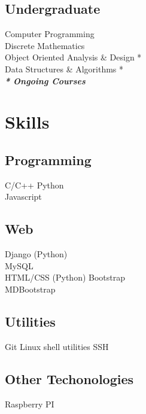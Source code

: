 \documentclass[]{deedy-resume-openfont}
\begin{document}
\begin{minipage}[t]{0.30\textwidth}

\subsection{Undergraduate}
Computer Programming \\
Discrete Mathematics \\
Object Oriented Analysis \& Design * \\
Data Structures \& Algorithms * \\
{\footnotesize \textit{\textbf{* Ongoing Courses}}}
\sectionsep


\section{Skills}
\subsection{Programming}
\textbullet{}   C/C++  \textbullet{} Python \\
\textbullet{} Javascript 
\sectionsep

\subsection{Web}
\textbullet{} Django (Python) \\ \textbullet{} MySQL \\ 
\textbullet{} HTML/CSS (Python) \textbullet{} Bootstrap \\ 
\textbullet{} MDBootstrap \\
\sectionsep

\subsection{Utilities}
 \textbullet{} Git \textbullet{} Linux shell utilities \textbullet{} SSH
\sectionsep
\subsection{Other Techonologies}
 \textbullet{} Raspberry PI \\


%
%

\end{minipage} 
\end{document}
